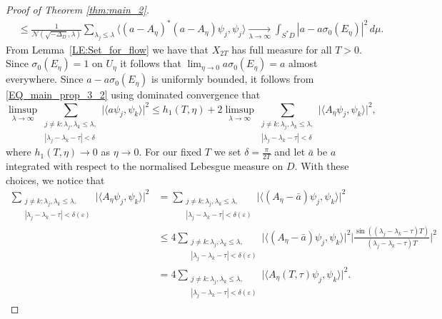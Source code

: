 \documentclass[10pt,a4paper]{amsart}
\newcommand{\1}{\mathrm{\mathbf{1}}}
\numberwithin{equation}{section}
\begin{document}
\begin{proof}[Proof of Theorem \ref{thm:main_2}]
\begin{equation}
\begin{aligned}
    &\leq  \frac{1}{\mathcal{N}(\sqrt{-\Delta_D},\lambda)} \sum_{ \lambda_j \leq \lambda } \langle (a- A_\eta)^{*}(a- A_\eta) \psi_j , \psi_j\rangle
    \underset{\lambda \rightarrow \infty}{\longrightarrow} \int_{S^{*}D} |a-a\sigma_0(E_\eta) |^2 \, d\mu.
    \end{aligned}
\end{equation}
From Lemma~\ref{LE:Set_for_flow} we have that $X_{2T}$ has full measure for all $T>0$. Since $\sigma_0(E_\eta)=1$ on $U_\eta$ it follows that $\lim_{\eta\rightarrow 0} a\sigma_0(E_\eta)=a$ almost everywhere. Since $a-a\sigma_0(E_\eta)$ is uniformly bounded, it follows from \eqref{EQ_main_prop_3_2} using dominated convergence that
\begin{equation}\label{EQ_main_prop_3_3}
    \limsup_{\lambda\rightarrow\infty}  \sum_{\substack{j\neq k: \lambda_j,\lambda_k\leq \lambda,  \\ |\lambda_{j}-\lambda_{k}-\tau| < \delta}} \big| \langle a \psi_j , \psi_k\rangle  \big|^2 
    \leq h_1(T,\eta) + 2 \limsup_{\lambda\rightarrow\infty}\sum_{\substack{j\neq k: \lambda_j,\lambda_k\leq \lambda,  \\ |\lambda_{j}-\lambda_{k}-\tau| < \delta}} \big| \langle A_\eta \psi_j , \psi_k\rangle  \big|^2, 
\end{equation}
where $h_1(T,\eta) \rightarrow 0$ as $\eta\rightarrow0$. 
For our fixed $T$ we set $\delta = \frac{\pi}{2T}$ and let $\bar{a}$ be $a$ integrated with respect to the normalised Lebesgue measure on $D$. With these choices, we notice that
\begin{equation}\label{EQ_main_prop_3_4}
\begin{aligned}
    \sum_{\substack{j\neq k: \lambda_j,\lambda_k\leq \lambda,  \\ |\lambda_{j}-\lambda_{k}-\tau| < \delta(\varepsilon)}} \big| \langle A_\eta \psi_j , \psi_k\rangle  \big|^2 
    & = \sum_{\substack{j\neq k: \lambda_j,\lambda_k\leq \lambda,  \\ |\lambda_{j}-\lambda_{k}-\tau| < \delta(\varepsilon)}} \big| \langle (A_\eta - \bar{a}) \psi_j , \psi_k\rangle  \big|^2 
    \\
    &\leq 4\sum_{\substack{j\neq k: \lambda_j,\lambda_k\leq \lambda,  \\ |\lambda_{j}-\lambda_{k}-\tau| < \delta(\varepsilon)}} \big| \langle (A_\eta - \bar{a}) \psi_j , \psi_k\rangle  \big|^2 \Big|\tfrac{\sin((\lambda_{j}-\lambda_{k}-\tau) T)}{(\lambda_{j}-\lambda_{k}-\tau) T}\Big|^2 
    \\
    &= 4 \sum_{\substack{j\neq k: \lambda_j,\lambda_k\leq \lambda,  \\ |\lambda_{j}-\lambda_{k}-\tau| < \delta(\varepsilon)}} \big| \langle A_\eta(T,\tau) \psi_j , \psi_k\rangle  \big|^2.

\end{aligned}
\end{equation}
\end{proof}
\end{document}
